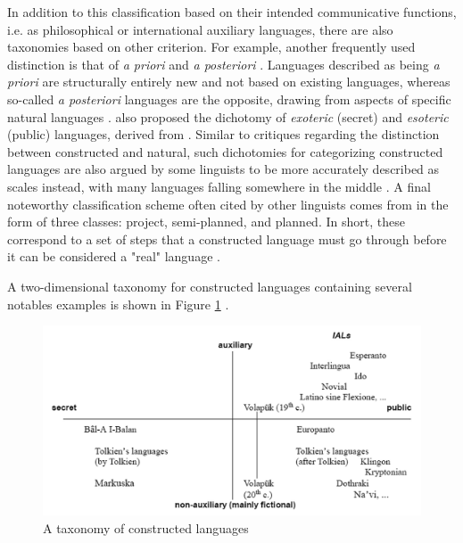 \documentclass[12pt,a4paper]{article}
\numberwithin{figure}{section}
\numberwithin{table}{section}
\numberwithin{definition}{section}
\begin{document}
In addition to this classification based on their intended communicative functions, i.e. as philosophical or international auxiliary languages, there are also taxonomies based on other criterion. For example, another frequently used distinction is that of \textit{a priori} and \textit{a posteriori} \parencite{Schreyer2021article,Gobbo2008article,Schubert1989inbook,Schubert2001book,Novikov2022article,Adelman2014article,Tonkin2015article}. Languages described as being \textit{a priori} are structurally entirely new \parencite{Tonkin2015article} and not based on existing languages, whereas so-called \textit{a posteriori} languages are the opposite, drawing from aspects of specific natural languages \parencite{Schreyer2021article}. \textcite{Gobbo2008article} also proposed the dichotomy of \textit{exoteric} (secret) and \textit{esoteric} (public) languages, derived from \textcite{Bausani1974book}. Similar to critiques regarding the distinction between constructed and natural, such dichotomies for categorizing constructed languages are also argued by some linguists to be more accurately described as scales instead, with many languages falling somewhere in the middle \parencite{Novikov2022article}. A final noteworthy classification scheme often cited by other linguists comes from \textcite{Blanke1989book} in the form of three classes: project, semi-planned, and planned. In short, these correspond to a set of steps that a constructed language must go through before it can be considered a "real" language \parencite{Schubert2001book}. 

A two-dimensional taxonomy for constructed languages containing several notables examples is shown in Figure \ref{fig:taxonomyplannedlanguages} \parencite{Gobbo2016article}.


\begin{figure}
  \centering
        \includegraphics[width=1.0\textwidth]{./Other/TaxonomyOfPlannedLanguages.png}
        \caption{A taxonomy of constructed languages \parencite{Gobbo2016article}}
        \label{fig:taxonomyplannedlanguages}
\end{figure}
\end{document}
